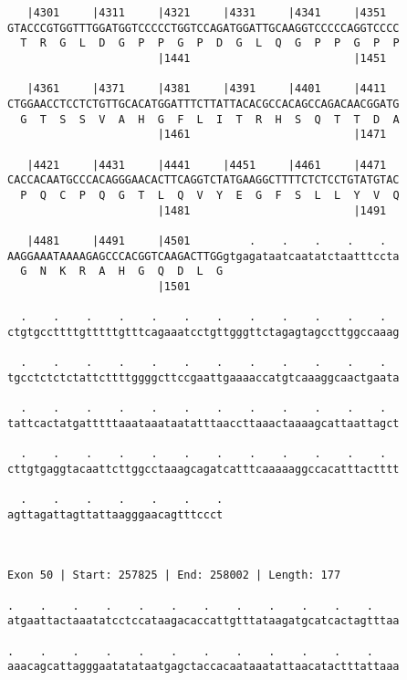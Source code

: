 \documentclass{article}
\begin{document}
\begin{Verbatim}
   |4301     |4311     |4321     |4331     |4341     |4351  
GTACCCGTGGTTTGGATGGTCCCCCTGGTCCAGATGGATTGCAAGGTCCCCCAGGTCCCC
  T  R  G  L  D  G  P  P  G  P  D  G  L  Q  G  P  P  G  P  P
                       |1441                         |1451  
  
   |4361     |4371     |4381     |4391     |4401     |4411  
CTGGAACCTCCTCTGTTGCACATGGATTTCTTATTACACGCCACAGCCAGACAACGGATG
  G  T  S  S  V  A  H  G  F  L  I  T  R  H  S  Q  T  T  D  A
                       |1461                         |1471  
  
   |4421     |4431     |4441     |4451     |4461     |4471  
CACCACAATGCCCACAGGGAACACTTCAGGTCTATGAAGGCTTTTCTCTCCTGTATGTAC
  P  Q  C  P  Q  G  T  L  Q  V  Y  E  G  F  S  L  L  Y  V  Q
                       |1481                         |1491  
  
   |4481     |4491     |4501         .    .    .    .    .  
AAGGAAATAAAAGAGCCCACGGTCAAGACTTGGgtgagataatcaatatctaatttccta
  G  N  K  R  A  H  G  Q  D  L  G                           
                       |1501                                
  
  .    .    .    .    .    .    .    .    .    .    .    .  
ctgtgccttttgtttttgtttcagaaatcctgttgggttctagagtagccttggccaaag
                                                            
  .    .    .    .    .    .    .    .    .    .    .    .  
tgcctctctctattcttttggggcttccgaattgaaaaccatgtcaaaggcaactgaata
                                                            
  .    .    .    .    .    .    .    .    .    .    .    .  
tattcactatgatttttaaataaataatatttaaccttaaactaaaagcattaattagct
                                                            
  .    .    .    .    .    .    .    .    .    .    .    .  
cttgtgaggtacaattcttggcctaaagcagatcatttcaaaaaggccacatttactttt
                                                            
  .    .    .    .    .    .    .
agttagattagttattaagggaacagtttccct
                                 
                                 
 
Exon 50 | Start: 257825 | End: 258002 | Length: 177
 
.    .    .    .    .    .    .    .    .    .    .    .    
atgaattactaaatatcctccataagacaccattgtttataagatgcatcactagtttaa
                                                            
.    .    .    .    .    .    .    .    .    .    .    .    
aaacagcattagggaatatataatgagctaccacaataaatattaacatactttattaaa
                                                            

\end{Verbatim}
\end{document}

